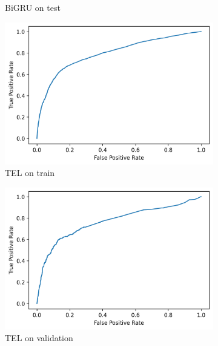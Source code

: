 \documentclass[utf8x]{ctexart}
\begin{document}
\begin{figure}[htb]
\begin{subfigure}[b]{0.32\textwidth}
    \caption{BiGRU on test}
    \label{fig:BiGRU_roc_test}
  \end{subfigure}


  \begin{subfigure}[b]{0.32\textwidth}
    \centering
    \includegraphics[width=\textwidth]{../images/Transformer_train_roc.png}
    \caption{TEL on train}
    \label{fig:Transformer_roc_train}
  \end{subfigure}
  \begin{subfigure}[b]{0.32\textwidth}
    \centering
    \includegraphics[width=\textwidth]{../images/Transformer_val_roc.png}
    \caption{TEL on validation}
    \label{fig:Transformer_roc_val}
  \end{subfigure}
  \begin{subfigure}[b]{0.32\textwidth}
    \centering

\end{subfigure}
\end{figure}
\end{document}
